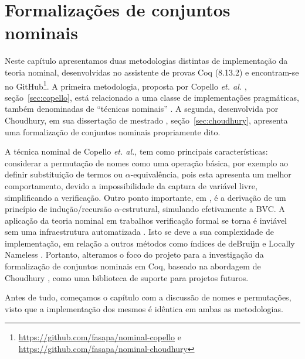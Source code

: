 \chapter{Formalizações de conjuntos nominais}\label{chp:formalizacao}

Neste capítulo apresentamos duas metodologias distintas de implementação da teoria nominal, desenvolvidas no assistente de provas Coq (8.13.2) e encontram-se no GitHub\footnote{\url{https://github.com/fasapa/nominal-copello} e \url{https://github.com/fasapa/nominal-choudhury}}. A primeira metodologia, proposta por Copello \textit{et. al.} \cite{Copello2016}, seção~\ref{sec:copello}, está relacionado a uma classe de implementações pragmáticas, também denominadas de ``técnicas nominais'' \cite{Aydemir2007,Copello2016,Tasistro2015,Copello2018,Ambal2020}. A segunda, desenvolvida por Choudhury, em sua dissertação de mestrado \cite{Choudhury2015}, seção~\ref{sec:choudhury}, apresenta uma formalização de conjuntos nominais propriamente dito.

A técnica nominal de Copello \textit{et. al.}, tem como principais características: considerar a permutação de nomes como uma operação básica, por exemplo ao definir substituição de termos ou $\alpha$-equivalência, pois esta apresenta um melhor comportamento, devido a impossibilidade da captura de variável livre, simplificando a verificação. Outro ponto importante, em \cite{Copello2016}, é a derivação de um princípio de indução/recursão $\alpha$-estrutural, simulando efetivamente a BVC.
A aplicação da teoria nominal em trabalhos verificação formal se torna é inviável sem uma infraestrutura automatizada \cite{Aydemir2008}. Isto se deve a sua complexidade de implementação, em relação a outros métodos como índices de deBruijn \cite{Bruijn1972} e Locally Nameless \cite{Chargueraud2011}.
Portanto, alteramos o foco do projeto para a investigação da formalização de conjuntos nominais em Coq, baseado na abordagem de Choudhury \cite{Choudhury2015}, como uma biblioteca de suporte para projetos futuros.

Antes de tudo, começamos o capítulo com a discussão de nomes e permutações, visto que a implementação dos mesmos é idêntica em ambas as metodologias.

